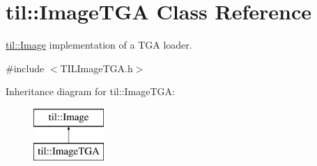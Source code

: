 \hypertarget{classtil_1_1_image_t_g_a}{
\section{til::ImageTGA Class Reference}
\label{classtil_1_1_image_t_g_a}
}


\hyperlink{classtil_1_1_image}{til::Image} implementation of a TGA loader.  




{\ttfamily \#include $<$TILImageTGA.h$>$}

Inheritance diagram for til::ImageTGA:\begin{figure}[H]
\begin{center}
\leavevmode
\includegraphics[height=2.000000cm]{classtil_1_1_image_t_g_a}
\end{center}
\end{figure}
